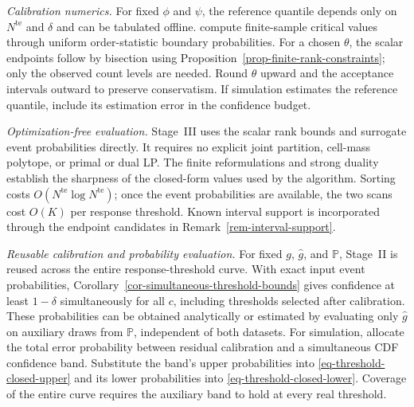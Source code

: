 \documentclass[review,11pt,3p,authoryear,nopreprintline]{elsarticle}
\begin{document}
\emph{Calibration numerics.}
For fixed $\phi$ and $\psi$, the reference quantile depends only on $N^{\mathrm{te}}$ and $\delta$ and can be tabulated offline. \citet[Supplement, Section~S.7]{L.J23} compute finite-sample critical values through uniform order-statistic boundary probabilities. For a chosen $\theta$, the scalar endpoints follow by bisection using Proposition~\ref{prop-finite-rank-constraints}; only the observed count levels are needed. Round $\theta$ upward and the acceptance intervals outward to preserve conservatism. If simulation estimates the reference quantile, include its estimation error in the confidence budget.

\emph{Optimization-free evaluation.}
Stage~III uses the scalar rank bounds and surrogate event probabilities directly. It requires no explicit joint partition, cell-mass polytope, or primal or dual LP. The finite reformulations and strong duality establish the sharpness of the closed-form values used by the algorithm. Sorting costs $O\left(N^{\mathrm{te}}\log N^{\mathrm{te}}\right)$; once the event probabilities are available, the two scans cost $O(K)$ per response threshold. Known interval support is incorporated through the endpoint candidates in Remark~\ref{rem-interval-support}.

\emph{Reusable calibration and probability evaluation.}
For fixed $g$, $\hat g$, and $\mathbb P$, Stage~II is reused across the entire response-threshold curve. With exact input event probabilities, Corollary~\ref{cor-simultaneous-threshold-bounds} gives confidence at least $1-\delta$ simultaneously for all $c$, including thresholds selected after calibration. These probabilities can be obtained analytically or estimated by evaluating only $\hat g$ on auxiliary draws from $\mathbb P$, independent of both datasets. For simulation, allocate the total error probability between residual calibration and a simultaneous CDF confidence band. Substitute the band's upper probabilities into \eqref{eq-threshold-closed-upper} and its lower probabilities into \eqref{eq-threshold-closed-lower}. Coverage of the entire curve requires the auxiliary band to hold at every real threshold.
\end{document}
